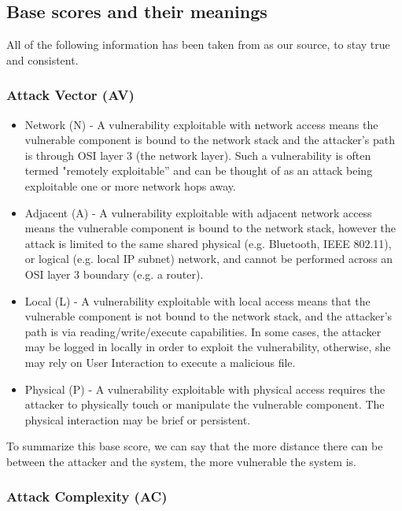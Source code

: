 \subsection{Base scores and their meanings}

All of the following information has been taken from \parencite{cvss3} as our source, to stay true and consistent.

\subsubsection{Attack Vector (AV)}

\begin{itemize}
	\item Network (N) - A vulnerability exploitable with network access means the vulnerable component is bound to the network stack and the attacker's path is through OSI layer 3 (the network layer). Such a vulnerability is often termed "remotely exploitable” and can be thought of as an attack being exploitable one or more network hops away.
	\item Adjacent (A) - A vulnerability exploitable with adjacent network access means the vulnerable component is bound to the network stack, however the attack is limited to the same shared physical (e.g. Bluetooth, IEEE 802.11), or logical (e.g. local IP subnet) network, and cannot be performed across an OSI layer 3 boundary (e.g. a router).
	\item Local (L) - A vulnerability exploitable with local access means that the vulnerable component is not bound to the network stack, and the attacker’s path is via reading/write/execute capabilities. In some cases, the attacker may be logged in locally in order to exploit the vulnerability, otherwise, she may rely on User Interaction to execute a malicious file.
	\item Physical (P) - A vulnerability exploitable with physical access requires the attacker to physically touch or manipulate the vulnerable component. The physical interaction may be brief or persistent.
\end{itemize}

To summarize this base score, we can say that the more distance there can be between the attacker and the system, the more vulnerable the system is.

\subsubsection{Attack Complexity (AC)}

